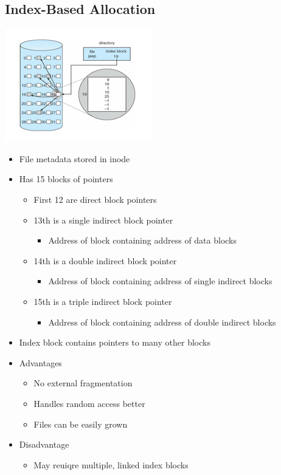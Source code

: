 \documentclass[12pt]{article}
\begin{document}
\subsection{Index-Based Allocation}
\begin{center}
\includegraphics[width=0.6\linewidth]{../images/midterm_4_solution_29.png}
\end{center}

\begin{itemize}
    \item File metadata stored in inode
    \item Has 15 blocks of pointers
    \begin{itemize}
        \item First 12 are direct block pointers
        \item 13th is a single indirect block pointer
        \begin{itemize}
            \item Address of block containing address of data blocks
        \end{itemize}
        \item 14th is a double indirect block pointer
        \begin{itemize}
            \item Address of block containing address of single indirect blocks
        \end{itemize}
        \item 15th is a triple indirect block pointer
        \begin{itemize}
            \item Address of block containing address of double indirect blocks
        \end{itemize}
    \end{itemize}
    \item Index block contains pointers to many other blocks
    \item Advantages
    \begin{itemize}
        \item No external fragmentation
        \item Handles random access better
        \item Files can be easily grown
    \end{itemize}
    \item Disadvantage
    \begin{itemize}
        \item May reuiqre multiple, linked index blocks
    \end{itemize}
\end{itemize}
\end{document}
